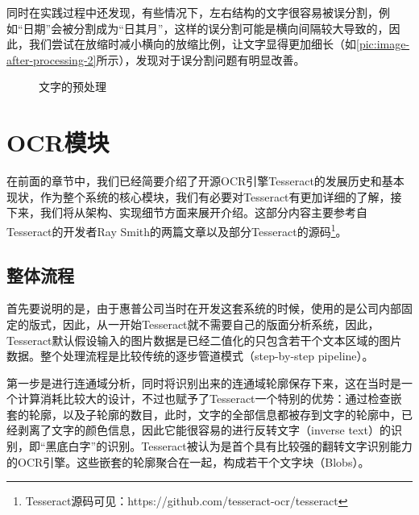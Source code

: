 同时在实践过程中还发现，有些情况下，左右结构的文字很容易被误分割，例如“日期”会被分割成为“日其月”，这样的误分割可能是横向间隔较大导致的，因此，我们尝试在放缩时减小横向的放缩比例，让文字显得更加细长（如\autoref{pic:image-after-processing-2}所示），发现对于误分割问题有明显改善。
\begin{figure}[htbp]
  \centering
  \caption{文字的预处理}
	\hfill
	\hfill
  \label{pic:pre-processing}
\end{figure}

\section{OCR模块}     %
在前面的章节中，我们已经简要介绍了开源OCR引擎Tesseract的发展历史和基本现状，作为整个系统的核心模块，我们有必要对Tesseract有更加详细的了解，接下来，我们将从架构、实现细节方面来展开介绍。这部分内容主要参考自Tesseract的开发者Ray Smith的两篇文章\citep{smith2007Tesseract,smith2013history}以及部分Tesseract的源码\footnote{Tesseract源码可见：https://github.com/tesseract-ocr/tesseract}。

\subsection{整体流程}
首先要说明的是，由于惠普公司当时在开发这套系统的时候，使用的是公司内部固定的版式，因此，从一开始Tesseract就不需要自己的版面分析系统，因此，Tesseract默认假设输入的图片数据是已经二值化的只包含若干个文本区域的图片数据。整个处理流程是比较传统的逐步管道模式（step-by-step pipeline）。

第一步是进行连通域分析，同时将识别出来的连通域轮廓保存下来，这在当时是一个计算消耗比较大的设计，不过也赋予了Tesseract一个特别的优势：通过检查嵌套的轮廓，以及子轮廓的数目，此时，文字的全部信息都被存到文字的轮廓中，已经剥离了文字的颜色信息，因此它能很容易的进行反转文字（inverse text）的识别，即“黑底白字”的识别。Tesseract被认为是首个具有比较强的翻转文字识别能力的OCR引擎。这些嵌套的轮廓聚合在一起，构成若干个文字块（Blobs）。

